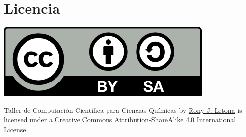 \documentclass[10pt,letterpaper]{article}
\begin{document}
\section*{Licencia}

\noindent \includegraphics{img/cc_big.png}

\noindent Taller de Computaci\'on Cient\'ifica para Ciencias Qu\'imicas by \href{http://github.com/zronyj/TQCA}{Rony J. Letona} is licensed under a \href{http://creativecommons.org/licenses/by-sa/4.0/}{Creative Commons Attribution-ShareAlike 4.0 International License}.
\end{document}
